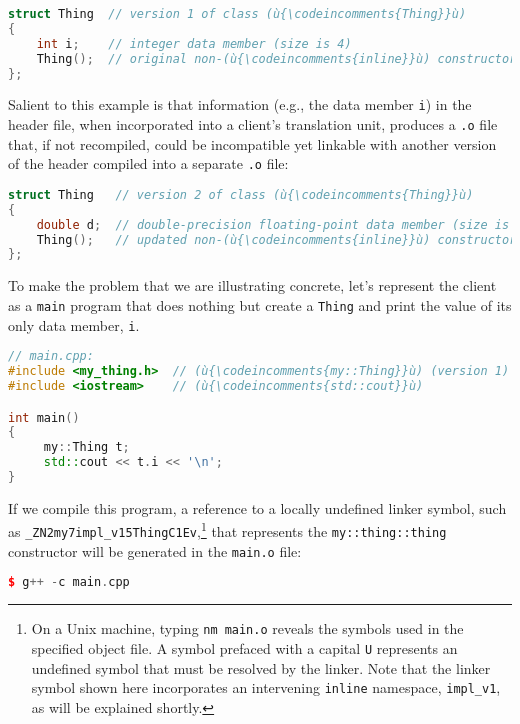 \begin{lstlisting}[language=C++]
struct Thing  // version 1 of class (ù{\codeincomments{Thing}}ù)
{
    int i;    // integer data member (size is 4)
    Thing();  // original non-(ù{\codeincomments{inline}}ù) constructor (defined in (ù{\codeincomments{.cpp}}ù) file)
};
\end{lstlisting}

\noindent Salient to this example is that information (e.g., the data member
\texttt{i}) in the header file, when incorporated into a client's
translation unit, produces a \texttt{.o} file that, if not recompiled,
could be incompatible yet linkable with another version of the header
compiled into a separate \texttt{.o} file:

\begin{lstlisting}[language=C++]
struct Thing   // version 2 of class (ù{\codeincomments{Thing}}ù)
{
    double d;  // double-precision floating-point data member (size is 8)
    Thing();   // updated non-(ù{\codeincomments{inline}}ù) constructor (defined in (ù{\codeincomments{.cpp}}ù) file)
};
\end{lstlisting}

\noindent To make the problem that we are illustrating concrete, let's represent
the client as a \texttt{main} program that does nothing but create a
\texttt{Thing} and print the value of its only data member, \texttt{i}.

\begin{lstlisting}[language=C++]
// main.cpp:
#include <my_thing.h>  // (ù{\codeincomments{my::Thing}}ù) (version 1)
#include <iostream>    // (ù{\codeincomments{std::cout}}ù)

int main()
{
     my::Thing t;
     std::cout << t.i << '\n';
}
\end{lstlisting}

\noindent If we compile this program, a reference to a locally undefined linker
symbol, such as
\texttt{\_ZN2my7impl\_v15ThingC1Ev},{\cprotect\footnote{On a Unix
machine, typing \texttt{nm}~\texttt{main.o} reveals the symbols used
in the specified object file. A symbol prefaced with a capital
\texttt{U} represents an undefined symbol that must be resolved by the
linker. Note that the linker symbol shown here incorporates an
intervening \texttt{inline} namespace, \texttt{impl\_v1}, as will be
  explained shortly.}} that represents the \texttt{my::thing::thing}
constructor will be generated in the \texttt{main.o} file:

\begin{lstlisting}[language=C++]
$ g++ -c main.cpp
\end{lstlisting}

